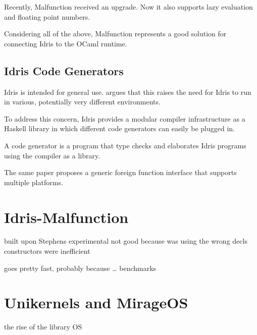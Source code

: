 Recently, Malfunction received an upgrade.
Now it also supports lazy evaluation and
floating point numbers.

Considering all of the above, Malfunction represents a good
solution for connecting Idris to the OCaml runtime.

\subsection{Idris Code Generators}
Idris is intended for general use. \citep{crosscompilers} argues
that this raises the need for Idris to run in various, potentially
very different environments. 

To address this concern, Idris provides a modular compiler 
infrastructure as a Haskell library in which different code
generators can easily be plugged in. 

A code generator is a program that type checks and elaborates 
Idris programs using the compiler as a library. 

The same paper proposes a generic foreign function interface that
supports multiple platforms.

\section{Idris-Malfunction}

built upon Stephens experimental
not good because was using the wrong decls
constructors were inefficient

goes pretty fast, probably because \ldots
benchmarks

\section{Unikernels and MirageOS}\label{sec:mirage}
the rise of the library OS